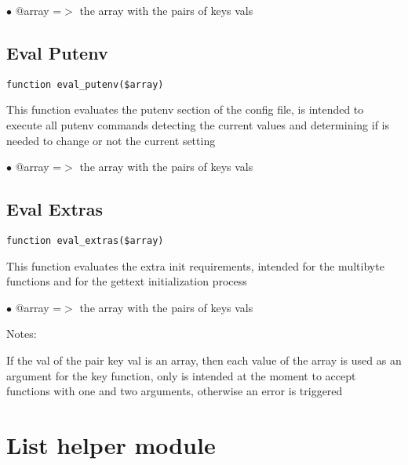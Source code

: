 \documentclass[a4paper]{book}
\begin{document}
\begin{compactitem}
\item[\color{myblue}$\bullet$] @array =$>$ the array with the pairs of keys vals
\end{compactitem}

\hypertarget{toc180}{}
\subsection{Eval Putenv}

\begin{lstlisting}
function eval_putenv($array)
\end{lstlisting}

This function evaluates the putenv section of the config file, is intended
to execute all putenv commands detecting the current values and determining
if is needed to change or not the current setting

\begin{compactitem}
\item[\color{myblue}$\bullet$] @array =$>$ the array with the pairs of keys vals
\end{compactitem}

\hypertarget{toc181}{}
\subsection{Eval Extras}

\begin{lstlisting}
function eval_extras($array)
\end{lstlisting}

This function evaluates the extra init requirements, intended for the multibyte
functions and for the gettext initialization process

\begin{compactitem}
\item[\color{myblue}$\bullet$] @array =$>$ the array with the pairs of keys vals
\end{compactitem}

Notes:

If the val of the pair key val is an array, then each value of the array is
used as an argument for the key function, only is intended at the moment to
accept functions with one and two arguments, otherwise an error is triggered

\hypertarget{toc182}{}
\section{List helper module}
\end{document}
